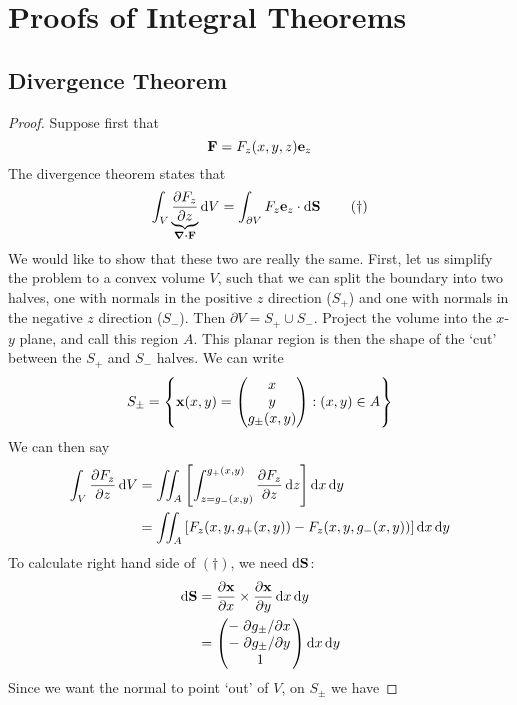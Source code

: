 \documentclass{article}
\begin{document}
\section{Proofs of Integral Theorems}
\subsection{Divergence Theorem}
\begin{proof}
	Suppose first that
	\[ \vb F = F_z(x,y,z) \vb e_z \]
	The divergence theorem states that
	\begin{equation}
		\int_V \underbrace{\pdv{F_z}{z}}_{\div{\vb F}} \dd{V} = \int_{\partial V} F_z \vb e_z \cdot \dd{\vb S}
		\tag{$\dagger$}
	\end{equation}
	We would like to show that these two are really the same. First, let us simplify the problem to a convex volume $V$, such that we can split the boundary into two halves, one with normals in the positive $z$ direction ($S_+$) and one with normals in the negative $z$ direction ($S_-$). Then $\partial V = S_+ \cup S_-$. Project the volume into the $x$-$y$ plane, and call this region $A$. This planar region is then the shape of the `cut' between the $S_+$ and $S_-$ halves. We can write
	\[ S_\pm = \left\{ \vb x(x, y) = \begin{pmatrix}
			x \\ y \\ g_\pm (x, y)
		\end{pmatrix} : (x, y) \in A \right\} \]
	We can then say
	\begin{align*}
		\int_V \pdv{F_z}{z} \dd{V} & = \iint_{A} \left[ \int_{z = g_- (x, y)}^{g_+ (x, y)} \pdv{F_z}{z} \dd{z} \right] \dd{x} \dd{y} \\
		                           & = \iint_A \left[ F_z(x, y, g_+ (x, y)) - F_z(x, y, g_- (x, y)) \right] \dd{x}\dd{y}
	\end{align*}
	To calculate right hand side of $(\dagger)$, we need $\dd{\vb S}$:
	\begin{align*}
		\dd{\vb S} & = \pdv{\vb x}{x} \times \pdv{\vb x}{y} \dd{x}\dd{y} \\
		           & = \begin{pmatrix}
			-\pdv*{g_\pm}{x} \\
			-\pdv*{g_\pm}{y} \\
			1                \\
		\end{pmatrix} \dd{x}\dd{y}
	\end{align*}
	Since we want the normal to point `out' of $V$, on $S_\pm$ we have

\end{proof}
\end{document}
